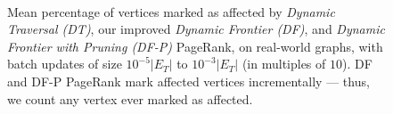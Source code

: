 \begin{figure}[!hbt]
  \centering
   \\[-2ex]
  \caption{Mean percentage of vertices marked as affected by \textit{Dynamic Traversal (DT)}, our improved \textit{Dynamic Frontier (DF)}, and \textit{Dynamic Frontier with Pruning (DF-P)} PageRank, on real-world graphs, with batch updates of size $10^{-5}|E_T|$ to $10^{-3}|E_T|$ (in multiples of $10$). DF and DF-P PageRank mark affected vertices incrementally --- thus, we count any vertex ever marked as affected. }
  \label{fig:measure-affected}
\end{figure}
